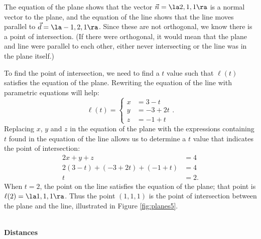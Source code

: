 {The equation of the plane shows that the vector $\vec n = \la 2,1,1\ra$ is a normal vector to the plane, and the equation of the line shows that the line moves parallel to $\vec d = \la -1,2,1\ra$. Since these are not orthogonal, we know there is a point of intersection. (If there were orthogonal, it would mean that the plane and line were parallel to each other, either never intersecting or the line was in the plane itself.)

To find the point of intersection, we need to find a $t$ value such that $\ell(t)$ satisfies the equation of the plane. Rewriting the equation of the line with parametric equations will help:
$$\ell(t) = \left\{\begin{aligned} x&= 3-t\\ y&=-3+2t\\ z&= -1+t \end{aligned}\right..$$
Replacing $x$, $y$ and $z$ in the equation of the plane with the expressions containing $t$ found in the equation of the line allows us to determine a $t$ value that indicates the point of intersection:
\begin{align*}
2x+y+z &=4 \\
2(3-t) + (-3+2t) + (-1+t) &= 4 \\
t&=2.
\end{align*}
When $t=2$, the point on the line satisfies the equation of the plane; that point is $\ell(2) = \la 1,1,1\ra$. Thus the point $(1,1,1)$ is the point of intersection between the plane and the line, illustrated in Figure \ref{fig:planes5}.
}\\

\noindent\textbf{\large Distances}\\

